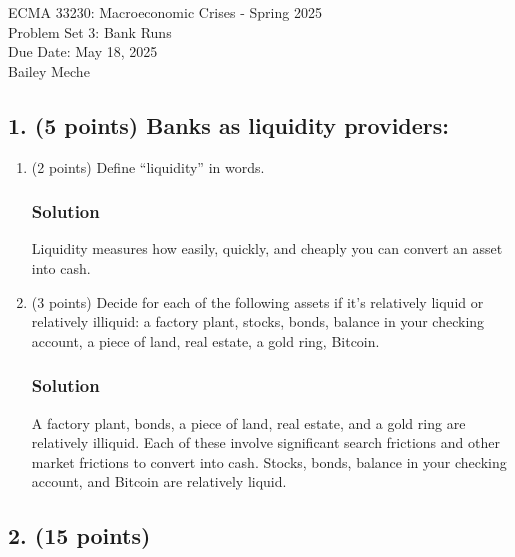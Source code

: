 \documentclass[12pt]{article}
\begin{document}
	\begin{center}
		ECMA 33230: Macroeconomic Crises - Spring 2025\\
        Problem Set 3: Bank Runs \\
		Due Date: May 18, 2025 \\
        Bailey Meche
	\end{center}

\subsection*{1. (5 points) Banks as liquidity providers:}

\begin{enumerate}[label=(\alph*)]
    \item (2 points) Define ``liquidity'' in words.
    \subsubsection*{Solution}

    Liquidity measures how easily, quickly, and cheaply you can convert an asset into cash. 

    \item (3 points) Decide for each of the following assets if it’s relatively liquid or relatively illiquid: a factory plant, stocks, bonds, balance in your checking account, a piece of land, real estate, a gold ring, Bitcoin.
     \subsubsection*{Solution}

     A factory plant, bonds,  a piece of land, real estate, and a gold ring are relatively illiquid. Each of these involve significant search frictions and other market frictions to convert into cash.  Stocks, bonds, balance in your checking account, and Bitcoin are relatively liquid. 
     
     
\end{enumerate}

\subsection*{2. (15 points)}
\end{document}
